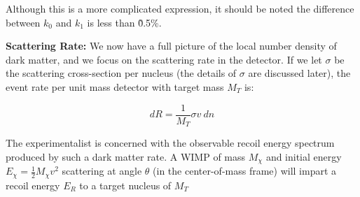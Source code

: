 Although this is a more complicated expression, it should be noted the difference between $k_{0}$ and $k_{1}$ is less than \~0.5\%. 

\textbf{Scattering Rate:} We now have a full picture of the local number density of dark matter, and we focus on the scattering rate in the detector. If we let $\sigma$ be the scattering cross-section per nucleus (the details of $\sigma$ are discussed later), the event rate per unit mass detector with target mass $M_{T}$ is:


\begin{equation}
\label{eq:rate}
dR = \frac{1}{M_{T}} \sigma  v~dn 
\end{equation}





The experimentalist is concerned with the observable recoil energy spectrum produced by such a dark matter rate. A \ac{WIMP} of mass $M_{\chi}$ and initial energy $E_{\chi} = \frac{1}{2}M_{\chi}v^{2}$ scattering at angle $\theta$ (in the center-of-mass frame) will impart a recoil energy $E_{R}$ to a target nucleus of $M_{T}$

